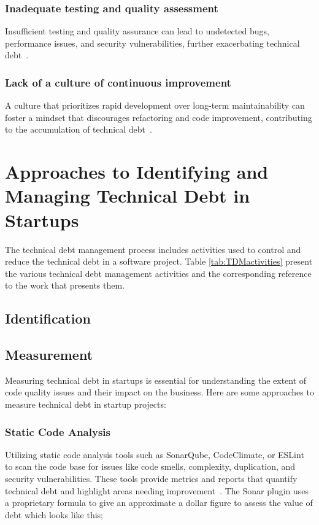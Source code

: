 \subsubsection{Inadequate testing and quality assessment}
Insufficient testing and quality assurance can lead to undetected bugs, performance issues, and security vulnerabilities, further exacerbating technical debt~\cite{HowtoGet43:online}.

\subsubsection{Lack of a culture of continuous improvement}
A culture that prioritizes rapid development over long-term maintainability can foster a mindset that discourages refactoring and code improvement, contributing to the accumulation of technical debt~\cite{FowlerBottlenecks,Whopayso60:online}.



\section{Approaches to Identifying and Managing Technical Debt in Startups} \label{Sec:Framework}
The technical debt management process includes activities used to control and reduce the technical debt in a software project. Table \ref{tab:TDMactivities} present the various technical debt management activities and the corresponding reference to the work that presents them.

\subsection{Identification}

\subsection{Measurement}
Measuring technical debt in startups is essential for understanding the extent of code quality issues and their impact on the business. Here are some approaches to measure technical debt in startup projects:

\subsubsection{Static Code Analysis} 
Utilizing static code analysis tools such as SonarQube, CodeClimate, or ESLint to scan the code base for issues like code smells, complexity, duplication, and security vulnerabilities. These tools provide metrics and reports that quantify technical debt and highlight areas needing improvement~\cite{Whopayso60:online}. The Sonar plugin uses a proprietary formula to give an approximate a dollar figure to assess the value of debt which looks like this;

